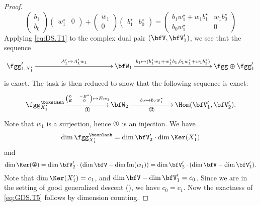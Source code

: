 \documentclass[12pt,a4paper]{amsart}
\makeatletter
\newcommand*{\circnuma}[1]{%
  \ifnum#1<1 %
    \@ctrerr
  \else
    \ifnum#1>20 %
      \@ctrerr
    \else
      \mbox{\ding{\numexpr 171+(#1)\relax}}%
     \fi
  \fi
}
\def\Im{\operatorname{Im}}
\numberwithin{equation}{section}
\theoremstyle{remark}
\def\mstar{{\star}}
\makeatother
\begin{document}
\begin{proof}
{      \[
        \begin{pmatrix}
          b_1\\
          b_0
        \end{pmatrix}
        \begin{pmatrix}
          w_1^\mstar & 0
        \end{pmatrix}
        +
        \begin{pmatrix}
          w_1\\
          0
        \end{pmatrix}
        \begin{pmatrix}
          b_1^\mstar & b_0^\mstar
        \end{pmatrix}
        = \begin{pmatrix}
          b_1 w_1^\mstar + w_1b_1^\mstar & w_1 b_0^\mstar\\
          b_0 w_1^\mstar & 0
        \end{pmatrix}
      \]
    } Applying \cref{eq:DS.T1} to the complex dual pair $(\bfV, \bfV'_1)$, we see that the
    sequence
    \[
      \xymatrix@C=11em{ \fgg'_{1,X'_1}\ar[r]^<>(.5){A'_1 \mapsto A'_1 w_1}& \bfW_1 \ar[r]^<>(.5){b_1\mapsto (b_1^\mstar w_1 + w_1^\mstar b_1 ,b_1w_1^\mstar+w_1b_1^\mstar)}& \fgg \oplus \fgg'_1
      }
    \]
    is exact. The task is then reduced to show that the following
    sequence is exact:
    \begin{equation}\label{eq:GDS.T5}
      \xymatrix@C=6em{ \fgg^{\boxslash}_{X'_1} \ar[r]^<>(.5){{\tiny \begin{pmatrix}
              0 & -E^*\\
              E & 0
            \end{pmatrix}}\mapsto Ew_1}_<>(.5){\circnuma{1}} & \bfW_2
        \ar[r]^<>(.5){b_2\mapsto b_2 w_1^\mstar}_<>(.5){\circnuma{2}} &
        \Hom(\bfV'_1, \bfV'_2).}
    \end{equation}
    Note that $w_1$ is a surjection, hence $\circnuma{1}$ is an injection. We
    have
    \[
      \dim \fgg^{\boxslash}_{X'_1} = \dim\bfV'_2 \cdot \dim \Ker(X'_1)
      \]
      and
      \[
      \dim \Ker(\circnuma{2}) = \dim \bfV'_2 \cdot (\dim \bfV - \dim \Im(w_1))
                                = \dim \bfV'_2 \cdot (\dim \bfV - \dim \bfV'_1).
    \]
    Note that $\dim \Ker(X'_1) = c_{1}$, and $\dim \bfV - \dim \bfV'_1=c_{0}$. Since we are in the setting of good generalized descent (), we have $c_0=c_1$. Now the
    exactness of \cref{eq:GDS.T5} follows by dimension counting.
  \end{proof}
\end{document}
